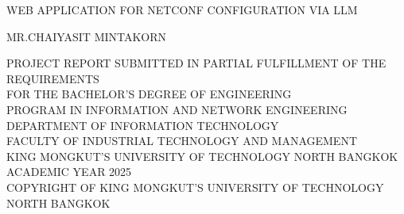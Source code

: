 \newpage
\thispagestyle{empty}
\begin{center}

\vspace*{-0.5in}


WEB APPLICATION FOR NETCONF CONFIGURATION VIA LLM     %


\vspace{0.2in}

\vspace{80mm}
MR.CHAIYASIT MINTAKORN      %
\vspace{84mm}   



\vspace{0.2in}



PROJECT REPORT SUBMITTED IN PARTIAL FULFILLMENT OF THE REQUIREMENTS\\



FOR THE BACHELOR’S DEGREE OF ENGINEERING\\
PROGRAM IN INFORMATION AND NETWORK ENGINEERING\\

DEPARTMENT OF INFORMATION TECHNOLOGY\\
FACULTY OF INDUSTRIAL TECHNOLOGY AND MANAGEMENT\\
KING MONGKUT’S UNIVERSITY OF TECHNOLOGY NORTH BANGKOK\\
ACADEMIC YEAR 2025\\
COPYRIGHT OF KING MONGKUT’S UNIVERSITY OF TECHNOLOGY NORTH BANGKOK

\end{center}